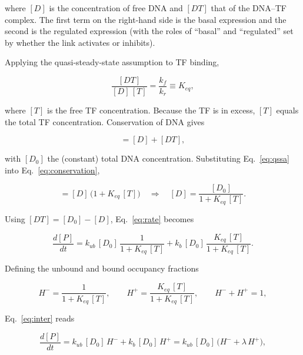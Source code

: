 where $[D]$ is the concentration of free DNA and $[DT]$ that of the DNA--TF
complex. The first term on the right-hand side is the basal expression and the
second is the regulated expression (with the roles of ``basal'' and
``regulated'' set by whether the link activates or inhibits).

Applying the quasi-steady-state assumption to TF binding,

\begin{equation}
    \frac{[DT]}{[D]\,[T]} = \frac{k_f}{k_r} \equiv K_{eq},
    \label{eq:qssa}
\end{equation}

where $[T]$ is the free TF concentration. Because the TF is in excess,
$[T]$ equals the total TF concentration. Conservation of DNA gives

\begin{equation}
    [D_0] = [D] + [DT],
    \label{eq:conservation}
\end{equation}

with $[D_0]$ the (constant) total DNA concentration. Substituting
Eq.~\eqref{eq:qssa} into Eq.~\eqref{eq:conservation},

\begin{equation}
    [D_0] = [D]\,\bigl(1 + K_{eq}\,[T]\bigr)
    \quad\Longrightarrow\quad
    [D] = \frac{[D_0]}{1 + K_{eq}\,[T]}.
    \label{eq:freeDNA}
\end{equation}

Using $[DT] = [D_0] - [D]$, Eq.~\eqref{eq:rate} becomes

\begin{equation}
    \frac{d[P]}{dt}
    = k_{ub}\,[D_0]\,\frac{1}{1 + K_{eq}\,[T]}
    + k_{b}\,[D_0]\,\frac{K_{eq}\,[T]}{1 + K_{eq}\,[T]}.
    \label{eq:inter}
\end{equation}

Defining the unbound and bound occupancy fractions

\begin{equation}
    H^{-} = \frac{1}{1 + K_{eq}\,[T]},
    \qquad
    H^{+} = \frac{K_{eq}\,[T]}{1 + K_{eq}\,[T]},
    \qquad H^{-} + H^{+} = 1,
    \label{eq:Hpm}
\end{equation}

Eq.~\eqref{eq:inter} reads

\begin{equation}
    \frac{d[P]}{dt}
    = k_{ub}\,[D_0]\,H^{-} + k_{b}\,[D_0]\,H^{+}
    = k_{ub}\,[D_0]\,\bigl(H^{-} + \lambda\,H^{+}\bigr),
    \label{eq:preNorm}
\end{equation}

